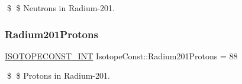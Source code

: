 \$ \$ Neutrons in Radium-\/201. \mbox{\label{group___isotope_const-_radium-_ra201_ga4cd44664dc8c9cf7c6b365e1a4b6769a}} 
\subsubsection{\texorpdfstring{Radium201\+Protons}{Radium201Protons}}
{\footnotesize\ttfamily \mbox{\hyperlink{group___isotope_const-_macros_ga5f18360b3e99483a35c32d789e62621c}{I\+S\+O\+T\+O\+P\+E\+C\+O\+N\+S\+T\+\_\+\+I\+NT}} Isotope\+Const\+::\+Radium201\+Protons = 88}

\$ \$ Protons in Radium-\/201. 